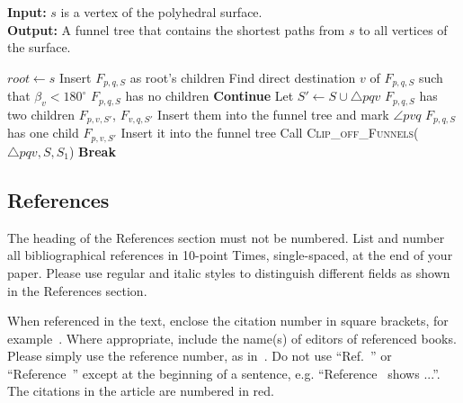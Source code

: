\begin{algorithm}[H]
\caption{Parallel Algorithm}
\textbf{Input:} $s$ is a vertex of the polyhedral surface. \\
\textbf{Output:} A funnel tree that contains the shortest paths from $s$ to all vertices of the surface.
\begin{algorithmic}[1]
\State $root \gets s$
    \State Insert $F_{p,q,S}$ as root's children
\EndFor
{} 
        \State Find direct destination $v$ of $F_{p,q,S}$ such that $\beta_v < 180^\circ$ 
            \State $F_{p,q,S}$ has no children
            \State \textbf{Continue}
        \Else
            \State Let $S' \gets S \cup \triangle pqv$
                \State $F_{p,q,S}$ has two children $F_{p,v,S'}$, $F_{v,q,S'}$
                \State Insert them into the funnel tree and mark $\angle pvq$
            \Else
                \State $F_{p,q,S}$ has one child $F_{p,v,S'}$
                \State Insert it into the funnel tree
            \EndIf
        \EndIf
    \EndFor
            \State Call \textsc{Clip\_off\_Funnels}($\triangle pqv, S, S_1$) 
        \EndIf
    \EndFor
        \State \textbf{Break}
    \EndIf
\EndFor
\end{algorithmic}
\end{algorithm}



\subsection{References}

The heading of the References section must not be numbered. List and number all bibliographical references in 10-point Times, single-spaced, at the end of your paper. Please use regular and italic styles to distinguish different fields as shown in the References section. 

When referenced in the text, enclose the citation number in square brackets, for example~\cite{b3}.  Where appropriate, include the name(s) of editors of referenced books. Please simply use the reference number, as in~\cite{b3}.  Do not use ``Ref.~\cite{b3}'' or ``Reference~\cite{b3}'' except at the beginning of a sentence, e.g.  ``Reference~\cite{b3} shows ...''. The citations in the article are numbered in red.

